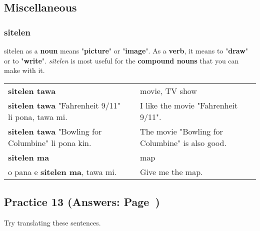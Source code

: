 \subsection*{Miscellaneous}
\subsubsection*{sitelen}
%
sitelen as a \textbf{noun} means "\textbf{picture}" or "\textbf{image}". 
As a \textbf{verb}, it means to "\textbf{draw}" or to "\textbf{write}". 
\textit{sitelen} is most useful for the \textbf{compound nouns} that you can make with it. 

\begin{supertabular}{p{5,5cm}|ll}
\textbf{sitelen tawa}  && movie, TV show \\
\textbf{sitelen tawa} "Fahrenheit 9/11" li pona, tawa mi. && I like the movie "Fahrenheit 9/11". \\
\textbf{sitelen tawa} "Bowling for Columbine" li pona kin. && The movie "Bowling for Columbine" is also good. \\
\textbf{sitelen ma} && map \\
o pana e \textbf{sitelen ma}, tawa mi. && Give me the map. \\
\end{supertabular} 
%
\subsection*{Practice 13 (Answers: Page~\pageref{'colors'})}
%
Try translating these sentences. \\

